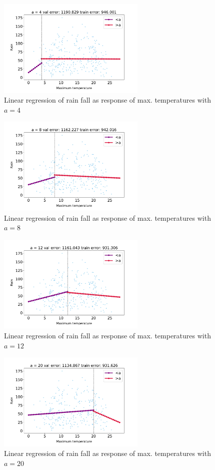 \documentclass[12pt,twoside]{article}
\begin{document}
\begin{enumerate}
\begin{enumerate}
	\begin{figure}[H]
		\centering
		\includegraphics[width=200pt]{figures/a=4.pdf}
		\caption{Linear regression of rain fall as response of max. temperatures with $a=4$}
		\label{fig1}
	\end{figure}

	\begin{figure}[H]
		\centering
		\includegraphics[width=200pt]{figures/a=8.pdf}
		\caption{Linear regression of rain fall as response of max. temperatures with $a=8$}
		\label{fig2}
	\end{figure}

	\begin{figure}[H]
		\centering
		\includegraphics[width=200pt]{figures/a=12.pdf}
		\caption{Linear regression of rain fall as response of max. temperatures with $a=12$}
		\label{fig3}
	\end{figure}

	\begin{figure}[H]
		\centering
		\includegraphics[width=200pt]{figures/a=20.pdf}
		\caption{Linear regression of rain fall as response of max. temperatures with $a=20$}
		\label{fig4}
	\end{figure}


\end{enumerate}
\end{enumerate}
\end{document}
